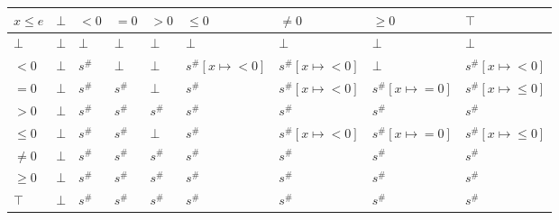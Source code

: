 \documentclass{article}
\begin{document}
                            \begin{table}[]
                                \begin{tabular}{|l|l|l|l|l|l|l|l|l|}
                                \hline
                                $x \le e$ & $\bot$ & $<0$   & $=0$   & $>0$   & $\le 0$               & $\ne 0$               & $\ge 0$               & $\top$                   \\ \hline
                                $\bot$    & $\bot$ & $\bot$ & $\bot$ & $\bot$ & $\bot$                & $\bot$                & $\bot$                & $\bot$                   \\ \hline
                                $<0$      & $\bot$ & $s^\#$ & $\bot$ & $\bot$ & $s^\#[x \mapsto <0] $ & $s^\#[x \mapsto <0] $ & $\bot$                & $s^\#[x \mapsto <0] $    \\ \hline
                                $=0$      & $\bot$ & $s^\#$ & $s^\#$ & $\bot$ & $s^\#$                & $s^\#[x \mapsto <0] $ & $s^\#[x \mapsto =0] $ & $s^\#[x \mapsto \le 0] $ \\ \hline
                                $>0$      & $\bot$ & $s^\#$ & $s^\#$ & $s^\#$ & $s^\#$                & $s^\#$                & $s^\#$                & $s^\#$                   \\ \hline
                                $\le 0$   & $\bot$ & $s^\#$ & $s^\#$ & $\bot$ & $s^\#$                & $s^\#[x \mapsto <0] $ & $s^\#[x \mapsto =0] $ & $s^\#[x \mapsto \le 0] $ \\ \hline
                                $\ne 0$   & $\bot$ & $s^\#$ & $s^\#$ & $s^\#$ & $s^\#$                & $s^\#$                & $s^\#$                & $s^\#$                   \\ \hline
                                $\ge 0$   & $\bot$ & $s^\#$ & $s^\#$ & $s^\#$ & $s^\#$                & $s^\#$                & $s^\#$                & $s^\#$                   \\ \hline
                                $\top$    & $\bot$ & $s^\#$ & $s^\#$ & $s^\#$ & $s^\#$                & $s^\#$                & $s^\#$                & $s^\#$                   \\ \hline
                                \end{tabular}
                                \end{table}
\end{document}
